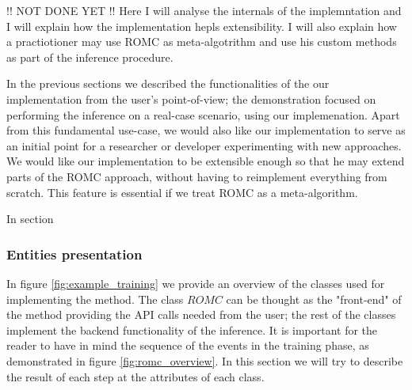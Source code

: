 !! NOT DONE YET !! Here I will analyse the internals of the implemntation and I will explain how the implementation hepls extensibility. I will also explain how a practiotioner may use ROMC as meta-algotrithm and use his custom methods as part of the inference procedure.


In the previous sections we described the functionalities of the our
implementation from the user's point-of-view; the demonstration
focused on performing the inference on a real-case scenario, using our
implemenation. Apart from this fundamental use-case, we would also
like our implementation to serve as an initial point for a researcher
or developer experimenting with new approaches. We would like our
implementation to be extensible enough so that he may extend parts of
the ROMC approach, without having to reimplement everything from
scratch. This feature is essential if we treat ROMC as a
meta-algorithm.


In section 


\subsubsection{Entities presentation}

In figure \ref{fig:example_training} we provide an overview of the
classes used for implementing the method. The class $\textit{ROMC}$
can be thought as the "front-end" of the method providing the API
calls needed from the user; the rest of the classes implement the
backend functionality of the inference. It is important for the reader
to have in mind the sequence of the events in the training phase, as
demonstrated in figure \ref{fig:romc_overview}. In this section we
will try to describe the result of each step at the attributes of each
class.

